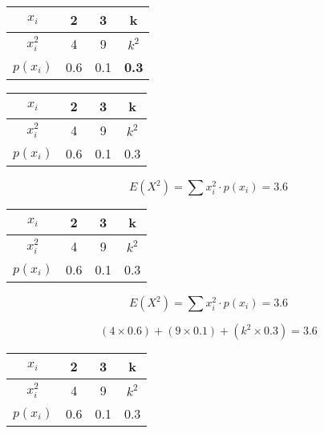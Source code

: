 \documentclass[]{report}
\begin{document}
	\begin{center}
		\begin{tabular}{|c|c|c|c|}
			\hline
			$x_i$ & \phantom{sp}2\phantom{sp} & \phantom{sp}3\phantom{sp} & \phantom{sp}k\phantom{sp} \\ \hline
			$x^2_i$ & 4 & 9 & $k^2$ \\ \hline
			$p(x_i)$ & 0.6 &  0.1 & \textbf{0.3} \\ \hline 
		\end{tabular}
	\end{center}
	
	
	
	
	
	
	
	\begin{center}
		\begin{tabular}{|c|c|c|c|}
			\hline
			$x_i$ & \phantom{sp}2\phantom{sp} & \phantom{sp}3\phantom{sp} & \phantom{sp}k\phantom{sp} \\ \hline
			$x^2_i$ & 4 & 9 & $k^2$ \\ \hline
			$p(x_i)$ & 0.6 &  0.1 & 0.3 \\ \hline 
		\end{tabular}
	\end{center}
	
	
	
	\[ E(X^2) =  \sum  x^2_i \cdot p(x_i)  = 3.6 \]
	
	
	
	
	
	
	
	
	
	\begin{center}
		\begin{tabular}{|c|c|c|c|}
			\hline
			$x_i$ & \phantom{sp}2\phantom{sp} & \phantom{sp}3\phantom{sp} & \phantom{sp}k\phantom{sp} \\ \hline
			$x^2_i$ & 4 & 9 & $k^2$ \\ \hline
			$p(x_i)$ & 0.6 &  0.1 & 0.3 \\ \hline 
		\end{tabular}
	\end{center}
	
	
	
	\[ E(X^2) =  \sum  x^2_i \cdot p(x_i)  = 3.6 \]
	
	\[(4 \times 0.6) + (9\times 0.1) + (k^2\times 0.3) = 3.6 \]
	
	
	
	
	
	
	
	\begin{center}
		\begin{tabular}{|c|c|c|c|}
			\hline
			$x_i$ & \phantom{sp}2\phantom{sp} & \phantom{sp}3\phantom{sp} & \phantom{sp}k\phantom{sp} \\ \hline
			$x^2_i$ & 4 & 9 & $k^2$ \\ \hline
			$p(x_i)$ & 0.6 &  0.1 & 0.3 \\ \hline 
		\end{tabular}
	\end{center}
	
\end{document}
